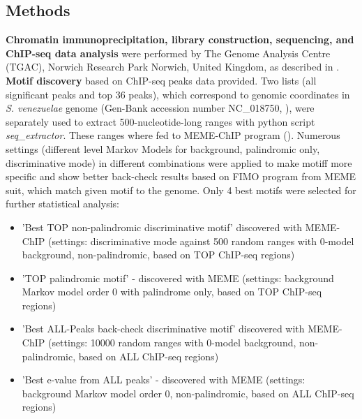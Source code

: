 \documentclass{bioinfo}
\begin{document}
\begin{methods}
\section{Methods}


{\bf Chromatin immunoprecipitation, library construction, sequencing, and ChIP-seq data analysis} were performed by The Genome Analysis Centre (TGAC), Norwich Research Park Norwich, United Kingdom, as described in \citealp{Bush2013}.\\
{\bf Motif discovery} based on ChIP-seq peaks data provided. Two lists (all significant peaks  and top 36 peaks), which correspond to genomic coordinates in {\it S. venezuelae} genome (Gen-Bank accession number NC\_018750, \citealp{Genome}), were separately used to extract 500-nucleotide-long ranges with python script {\it seq\_extractor}. These ranges where fed to MEME-ChIP program (\citealp{MEME}). Numerous settings (different level Markov Models for background, palindromic only, discriminative mode) in different combinations were applied to make motiff more specific and show better back-check results based on FIMO program from MEME suit, which match given motif to the genome. Only 4 best motifs were selected for further statistical analysis:

\begin{itemize}
\item 'Best TOP non-palindromic discriminative motif’ discovered with MEME-ChIP (settings: discriminative mode against 500 random ranges with 0-model background, non-palindromic, based on TOP ChIP-seq regions)
\item 'TOP palindromic motif' - discovered with MEME (settings: background Markov model order 0 with palindrome only, based on TOP ChIP-seq regions)
\item 'Best ALL-Peaks back-check discriminative motif' discovered with MEME-ChIP (settings: 10000 random ranges with 0-model background, non-palindromic, based on ALL ChIP-seq regions)
\item 'Best e-value from ALL peaks' - discovered with MEME (settings: background Markov model order 0, non-palindromic, based on ALL ChIP-seq regions)\\
\end{itemize}


\end{methods}
\end{document}
